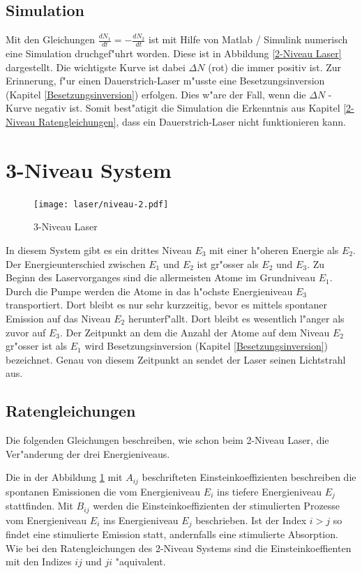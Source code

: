 \begin{refsection}
\subsection{Simulation}
\label{2-Niveau System Simulation}
Mit den Gleichungen  $\frac{dN_1}{dt} = -\frac{dN_2}{dt}$ ist mit Hilfe von
Matlab / Simulink numerisch eine Simulation druchgef"uhrt worden.
Diese ist in Abbildung \ref{2-Niveau Laser}  dargestellt.
Die wichtigste Kurve ist dabei $\Delta N $ (rot) die immer positiv ist.
Zur Erinnerung, f"ur einen Dauerstrich-Laser m"usste eine Besetzungsinversion
(Kapitel \ref{Besetzungsinversion}) erfolgen.
Dies w"are der Fall, wenn die $\Delta N $ - Kurve negativ ist.
Somit best"atigit die Simulation die Erkenntnis aus Kapitel
\ref{2-Niveau Ratengleichungen}, dass ein Dauerstrich-Laser nicht
funktionieren kann.

\section{3-Niveau System}
\label{3-Niveau System}

\begin{figure}
\centering
\texttt{[image: laser/niveau-2.pdf]}
\caption{3-Niveau Laser}
\label{3-Niveau Laser}
\end{figure}

In diesem System gibt es ein drittes Niveau $E_3$ mit einer h"oheren Energie
als $E_2$. 
Der Energieunterschied zwischen $E_1$ und $E_2$ ist gr"osser 
als $E_2$ und $E_3$.
Zu Beginn des Laservorganges sind die allermeisten Atome im Grundniveau $E_1$.
Durch die Pumpe werden die Atome in das h"ochste Energieniveau $E_3$
transportiert.
Dort bleibt es nur sehr kurzzeitig, bevor es mittels spontaner Emission auf das
Niveau $E_2$ herunterf"allt.
Dort bleibt es wesentlich l"anger als zuvor auf $E_3$.
Der Zeitpunkt an dem die Anzahl der Atome auf dem Niveau $E_2$ gr"osser ist als
$E_1$ wird Besetzungsinversion (Kapitel \ref{Besetzungsinversion}) bezeichnet.
Genau von diesem Zeitpunkt an sendet der Laser seinen Lichtstrahl aus.

\subsection{Ratengleichungen}
\label{3-Niveau Ratengleichungen}
Die folgenden Gleichungen  beschreiben, wie schon beim 2-Niveau Laser, die
Ver"anderung der drei Energieniveaus.

Die in der Abbildung \ref{3-Niveau Laser} mit $A_{ij}$ beschrifteten
Einsteinkoeffizienten beschreiben die spontanen Emissionen die vom
Energieniveau $E_i$ ins tiefere Energieniveau $E_j$ stattfinden.
Mit $B_{ij}$ werden die Einsteinkoeffizienten der stimulierten Prozesse
vom Energieniveau $E_i$ ins Energieniveau $E_j$ beschrieben. 
Ist der Index $i > j$ so findet eine stimulierte Emission statt,
andernfalls eine stimulierte Absorption.
Wie bei den Ratengleichungen des 2-Niveau Systems sind die Einsteinkoeffienten
mit den Indizes $ij$ und $ji$ "aquivalent.



\end{refsection}

